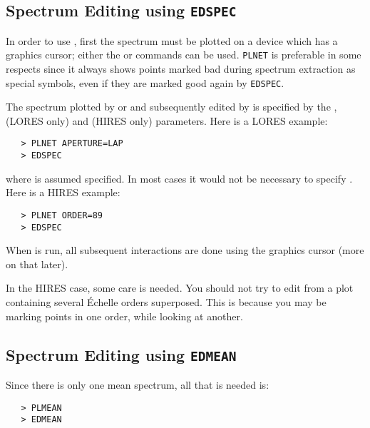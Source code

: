 \subsection{Spectrum Editing using {\tt EDSPEC}}

In order to use , first the spectrum must
be plotted on a device
which has a graphics cursor; either the 
 or  commands can be used.
\verb+PLNET+ is preferable in some respects since it always
shows points marked bad during spectrum extraction as special symbols, even if
they are marked good again by \verb+EDSPEC+\@.

The spectrum plotted by  or
 and subsequently edited by
 is specified by the
, 
 (LORES only) and 
 (HIRES only) parameters.  Here is a LORES example:

\begin{verbatim}
   > PLNET APERTURE=LAP
   > EDSPEC
\end{verbatim}

where  is assumed specified.  In most
cases it would not be necessary to specify
\@.  Here is a HIRES example:

\begin{verbatim}
   > PLNET ORDER=89
   > EDSPEC
\end{verbatim}

When  is run, all subsequent interactions
are done using the graphics cursor (more on that later)\@.

In the HIRES case, some care is needed.  You should not try to edit from a
plot containing several \'{E}chelle orders superposed.  This is because you
may be marking points in one order, while looking at another.


\subsection{Spectrum Editing using {\tt EDMEAN}}

Since there is only one mean spectrum, all that is needed is:

\begin{verbatim}
   > PLMEAN
   > EDMEAN
\end{verbatim}

